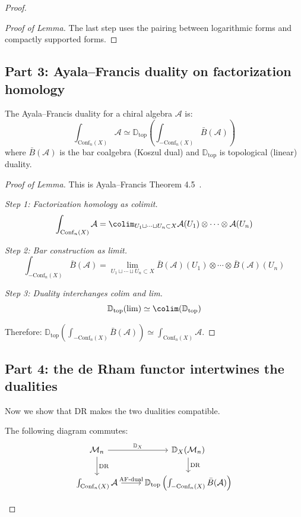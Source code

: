 \begin{proof}
\begin{proof}[Proof of Lemma]
The last step uses the pairing between logarithmic forms and compactly supported forms. \qedhere
\end{proof}

\subsection*{Part 3: Ayala--Francis duality on factorization homology}

\begin{lemma}\label{lem:AF-dual-chiral}
The Ayala--Francis duality for a chiral algebra $\mathcal{A}$ is:
\[\int_{\text{Conf}_n(X)} \mathcal{A} \simeq \mathbb{D}_{\text{top}}\left(\int_{-\text{Conf}_n(X)} \bar{B}(\mathcal{A})\right)\]
where $\bar{B}(\mathcal{A})$ is the bar coalgebra (Koszul dual) and $\mathbb{D}_{\text{top}}$ is topological (linear) duality.
\end{lemma}

\begin{proof}[Proof of Lemma]
This is Ayala--Francis Theorem 4.5~\cite{AF15}.

\emph{Step 1: Factorization homology as colimit.}
\[\int_{\text{Conf}_n(X)} \mathcal{A} = \colim_{U_1 \sqcup \cdots \sqcup U_n \subset X} \mathcal{A}(U_1) \otimes \cdots \otimes \mathcal{A}(U_n)\]

\emph{Step 2: Bar construction as limit.}
\[\int_{-\text{Conf}_n(X)} \bar{B}(\mathcal{A}) = \lim_{U_1 \sqcup \cdots \sqcup U_n \subset X} \bar{B}(\mathcal{A})(U_1) \otimes \cdots \otimes \bar{B}(\mathcal{A})(U_n)\]

\emph{Step 3: Duality interchanges colim and lim.}
\[\mathbb{D}_{\text{top}}(\lim) \simeq \colim(\mathbb{D}_{\text{top}})\]

Therefore: $\mathbb{D}_{\text{top}}\left(\int_{-\text{Conf}_n(X)} \bar{B}(\mathcal{A})\right) \simeq \int_{\text{Conf}_n(X)} \mathcal{A}$. \qedhere
\end{proof}

\subsection*{Part 4: the de Rham functor intertwines the dualities}

Now we show that DR makes the two dualities compatible.

\begin{proposition}\label{prop:key-compat-DR}
The following diagram commutes:
\[
\begin{tikzcd}
\mathcal{M}_n \arrow[r, "\mathbb{D}_X"] \arrow[d, "\text{DR}"] 
& \mathbb{D}_X(\mathcal{M}_n) \arrow[d, "\text{DR}"] \\
\int_{\text{Conf}_n(X)} \mathcal{A} \arrow[r, "\text{AF-dual}"] 
& \mathbb{D}_{\text{top}}\left(\int_{-\text{Conf}_n(X)} \bar{B}(\mathcal{A})\right)
\end{tikzcd}
\]
\end{proposition}


\end{proof}
